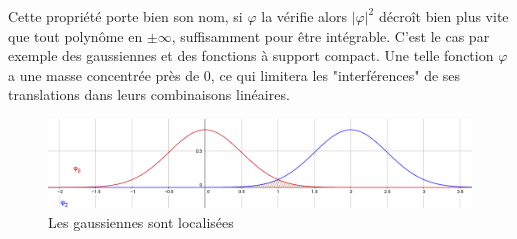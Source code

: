 \documentclass[]{article}
\theoremstyle{remark}
\newtheorem{myexmpl}{Exemple}
\theoremstyle{definition}
\newcommand{\DS}{\displaystyle}
\begin{document}
	Cette propriété porte bien son nom, si $\varphi$ la vérifie alors $|\varphi|^2$ décroît bien plus vite que tout polynôme en $\pm \infty$, suffisamment pour être intégrable. C'est le cas par exemple des gaussiennes et des fonctions à support compact. Une telle fonction $\varphi$ a une masse concentrée près de 0, ce qui limitera les "interférences" de ses translations dans leurs combinaisons linéaires.
	
	\begin{figure}[h]
		\centering
		\includegraphics[width=450pt]{Localized.png}
		\caption{Les gaussiennes sont localisées}
	\end{figure}
	
%		
%		
%		
%		
%		
%		
		
\end{document}
